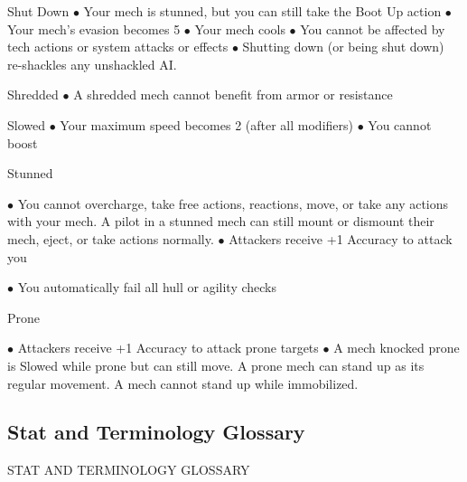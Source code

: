 Shut Down   
    $\bullet$    Your mech is stunned, but you can still take the Boot Up action  
    $\bullet$    Your mech’s evasion becomes 5  
    $\bullet$    Your mech cools  
    $\bullet$    You cannot be affected by tech actions or system attacks or effects  
    $\bullet$    Shutting down (or being shut down) re-shackles any unshackled AI.
 
Shredded  
    $\bullet$    A shredded mech cannot benefit from armor or resistance
 

                                                                                                          


Slowed  
     $\bullet$    Your maximum speed becomes 2 (after all modifiers)  
     $\bullet$    You cannot boost
 
Stunned 
 
     $\bullet$    You cannot overcharge, take free actions, reactions, move, or take any actions with your  
         mech. A pilot in a stunned mech can still mount or dismount their mech, eject, or take  
         actions normally.  
     $\bullet$    Attackers receive +1 Accuracy to attack you
 
     $\bullet$    You automatically fail all hull or agility checks
 
Prone 
 
     $\bullet$    Attackers receive +1 Accuracy to attack prone targets  
     $\bullet$    A mech knocked prone is Slowed while prone but can still move. A prone mech can stand  
         up as its regular movement. A mech cannot stand up while immobilized.  
\subsection{Stat and Terminology Glossary}
                          STAT AND TERMINOLOGY GLOSSARY  

